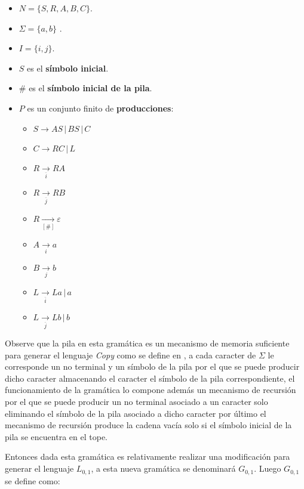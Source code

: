\documentclass{article}
\begin{document}
\begin{itemize}
    \item $N= \{S,R,A,B,C\}$.
    \item \( \Sigma=\{a,b\} \) .
    \item $I=\{i,j\}$.
    \item $S$ es el \textbf{símbolo inicial}.
    \item $\#$ es el \textbf{símbolo inicial de la pila}.
    \item $P$ es un conjunto finito de \textbf{producciones}:
          \begin{multicols}{2}
              \begin{itemize}
                  \item $S\to AS\,|\,BS\,|\,C$
                  \item $C\to RC\,|\,L$
                  \item $R\underset{\overline{i}}{\to} RA$
                  \item $R\underset{\overline{j}}{\to} RB$
                  \item $R\underset{[\#]}{\to} \varepsilon$
                  \item $A\underset{i}{\to} a$
                  \item $B\underset{j}{\to} b$
                  \item $L\underset{\overline{i}}{\to} La\,|\,a$
                  \item $L\underset{\overline{j}}{\to} Lb\,|\,b$
              \end{itemize}
          \end{multicols}
\end{itemize}

Observe que la pila en esta gramática es un mecanismo de memoria suficiente para generar el lenguaje \textit{Copy} como se
define en \cite{globalIndexLanguages}, a cada caracter de $\Sigma$ le corresponde un no terminal y un símbolo de la pila 
por el que se puede producir dicho caracter almacenando el caracter el símbolo de la pila correspondiente, el funcionamiento 
de la gramática lo compone además un mecanismo de recursión por el que se puede producir un no terminal asociado a un caracter
solo eliminando el símbolo de la pila asociado a dicho caracter por último el mecanismo de recursión produce la cadena vacía
solo si el símbolo inicial de la pila se encuentra en el tope.

Entonces dada esta gramática es relativamente realizar una modificación para generar el lenguaje $L_{0,1}$,
a esta nueva gramática se denominará $G_{0,1}$. Luego $G_{0,1}$ se define como:
\end{document}
